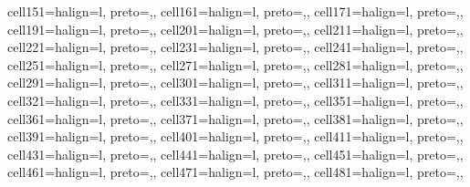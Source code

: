 \begin{table}
\begin{talltblr}[         %
caption={Technology Adoption Models:  Germany},
note{}={* p \num{< 0.1}, ** p \num{< 0.05}, *** p \num{< 0.01}},
note{ }={* p < 0.1, ** p < 0.05, *** p < 0.01},
]
{cell{15}{1}={}{halign=l, preto={\hspace{1em}},},
cell{16}{1}={}{halign=l, preto={\hspace{1em}},},
cell{17}{1}={}{halign=l, preto={\hspace{1em}},},
cell{19}{1}={}{halign=l, preto={\hspace{1em}},},
cell{20}{1}={}{halign=l, preto={\hspace{1em}},},
cell{21}{1}={}{halign=l, preto={\hspace{1em}},},
cell{22}{1}={}{halign=l, preto={\hspace{1em}},},
cell{23}{1}={}{halign=l, preto={\hspace{1em}},},
cell{24}{1}={}{halign=l, preto={\hspace{1em}},},
cell{25}{1}={}{halign=l, preto={\hspace{1em}},},
cell{27}{1}={}{halign=l, preto={\hspace{1em}},},
cell{28}{1}={}{halign=l, preto={\hspace{1em}},},
cell{29}{1}={}{halign=l, preto={\hspace{1em}},},
cell{30}{1}={}{halign=l, preto={\hspace{1em}},},
cell{31}{1}={}{halign=l, preto={\hspace{1em}},},
cell{32}{1}={}{halign=l, preto={\hspace{1em}},},
cell{33}{1}={}{halign=l, preto={\hspace{1em}},},
cell{35}{1}={}{halign=l, preto={\hspace{1em}},},
cell{36}{1}={}{halign=l, preto={\hspace{1em}},},
cell{37}{1}={}{halign=l, preto={\hspace{1em}},},
cell{38}{1}={}{halign=l, preto={\hspace{1em}},},
cell{39}{1}={}{halign=l, preto={\hspace{1em}},},
cell{40}{1}={}{halign=l, preto={\hspace{1em}},},
cell{41}{1}={}{halign=l, preto={\hspace{1em}},},
cell{43}{1}={}{halign=l, preto={\hspace{1em}},},
cell{44}{1}={}{halign=l, preto={\hspace{1em}},},
cell{45}{1}={}{halign=l, preto={\hspace{1em}},},
cell{46}{1}={}{halign=l, preto={\hspace{1em}},},
cell{47}{1}={}{halign=l, preto={\hspace{1em}},},
cell{48}{1}={}{halign=l, preto={\hspace{1em}},},
}
\end{talltblr}
\end{table}
